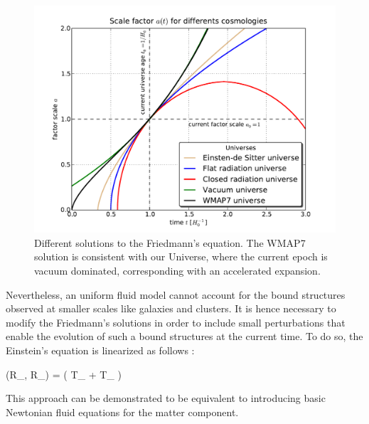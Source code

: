 \documentclass[a4,useAMS,usenatbib,usegraphicx,12pt]{article}
\begin{document}
\begin{figure}[h]
\centering

  \includegraphics[trim = 12mm 4mm 17mm 8mm, clip, keepaspectratio=true,
  width=0.4\textheight]{./figures/Friedmann_Solution.pdf}
  
  \caption{\small Different solutions to the Friedmann's equation. The WMAP7
  solution is consistent with our Universe, where the current epoch
  is vacuum dominated, corresponding with an accelerated expansion.}

  \label{fig:Friedmann}

\end{figure}


Nevertheless, an uniform fluid model cannot account for the bound structures 
observed at smaller scales like galaxies and clusters. It is hence necessary 
to modify the Friedmann's solutions in order to include small perturbations 
that enable the evolution of such a bound structures at the current time. To do
so, the Einstein's equation is linearized as follows \citep{padmanabhan1995}:


{ (R_{\mu \nu}, \delta R_{\mu \nu}) = 
( T_{\mu \nu} + \delta T_{\mu \nu} ) }


This approach can be demonstrated to be equivalent to introducing basic 
Newtonian fluid equations for the matter component.
\end{document}
